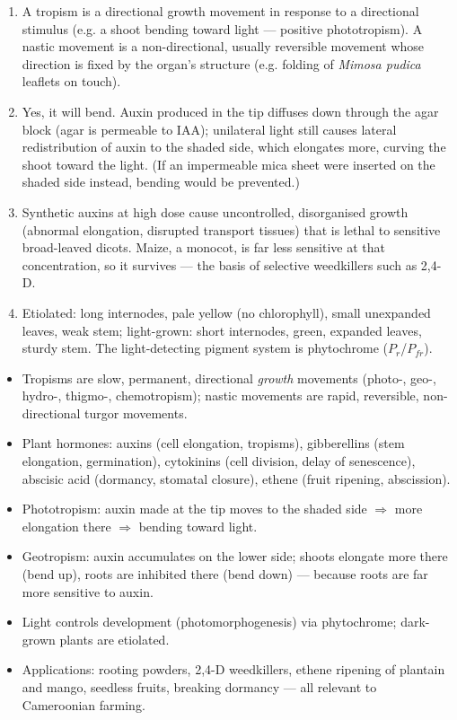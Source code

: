 \documentclass[11pt]{article}
\begin{document}
\begin{corrige}[Exercise 1]
\begin{enumerate}
\item A tropism is a directional growth movement in response to a directional stimulus (e.g. a shoot bending toward light — positive phototropism). A nastic movement is a non-directional, usually reversible movement whose direction is fixed by the organ's structure (e.g. folding of \emph{Mimosa pudica} leaflets on touch).
\item Yes, it will bend. Auxin produced in the tip diffuses down through the agar block (agar is permeable to IAA); unilateral light still causes lateral redistribution of auxin to the shaded side, which elongates more, curving the shoot toward the light. (If an impermeable mica sheet were inserted on the shaded side instead, bending would be prevented.)
\item Synthetic auxins at high dose cause uncontrolled, disorganised growth (abnormal elongation, disrupted transport tissues) that is lethal to sensitive broad-leaved dicots. Maize, a monocot, is far less sensitive at that concentration, so it survives — the basis of selective weedkillers such as 2,4-D.
\item Etiolated: long internodes, pale yellow (no chlorophyll), small unexpanded leaves, weak stem; light-grown: short internodes, green, expanded leaves, sturdy stem. The light-detecting pigment system is phytochrome ($P_r$/$P_{fr}$).
\end{enumerate}
\end{corrige}

\begin{aretenir}
\begin{itemize}
\item Tropisms are slow, permanent, directional \emph{growth} movements (photo-, geo-, hydro-, thigmo-, chemotropism); nastic movements are rapid, reversible, non-directional turgor movements.
\item Plant hormones: auxins (cell elongation, tropisms), gibberellins (stem elongation, germination), cytokinins (cell division, delay of senescence), abscisic acid (dormancy, stomatal closure), ethene (fruit ripening, abscission).
\item Phototropism: auxin made at the tip moves to the shaded side $\Rightarrow$ more elongation there $\Rightarrow$ bending toward light.
\item Geotropism: auxin accumulates on the lower side; shoots elongate more there (bend up), roots are inhibited there (bend down) — because roots are far more sensitive to auxin.
\item Light controls development (photomorphogenesis) via phytochrome; dark-grown plants are etiolated.
\item Applications: rooting powders, 2,4-D weedkillers, ethene ripening of plantain and mango, seedless fruits, breaking dormancy — all relevant to Cameroonian farming.
\end{itemize}
\end{aretenir}
\end{document}
